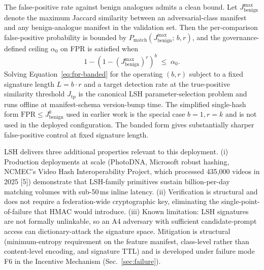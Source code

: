 \documentclass[11pt]{article}
\begin{document}
The false-positive rate against benign analogues admits a clean bound. Let $J_{\text{benign}}^{\max}$ denote the maximum Jaccard similarity between an adversarial-class manifest and any benign-analogue manifest in the validation set. Then the per-comparison false-positive probability is bounded by $P_{\text{match}}(J_{\text{benign}}^{\max};\, b, r)$, and the governance-defined ceiling $\alpha_0$ on FPR is satisfied when
\begin{equation}
1 - \left(1 - (J_{\text{benign}}^{\max})^{r}\right)^{b} \;\leq\; \alpha_0.
\label{eq:fpr-banded}
\end{equation}
Solving Equation~\eqref{eq:fpr-banded} for the operating $(b, r)$ subject to a fixed signature length $L = b \cdot r$ and a target detection rate at the true-positive similarity threshold $J_{\text{tp}}$ is the canonical LSH parameter-selection problem and runs offline at manifest-schema version-bump time. The simplified single-hash form $\text{FPR} \leq J_{\text{benign}}^{k}$ used in earlier work is the special case $b=1, r=k$ and is not used in the deployed configuration. The banded form gives substantially sharper false-positive control at fixed signature length.

LSH delivers three additional properties relevant to this deployment. (i) Production deployments at scale (PhotoDNA, Microsoft robust hashing, NCMEC's Video Hash Interoperability Project, which processed 435{,}000 videos in 2025 [5]) demonstrate that LSH-family primitives sustain billion-per-day matching volumes with sub-50\,ms inline latency. (ii) Verification is structural and does not require a federation-wide cryptographic key, eliminating the single-point-of-failure that HMAC would introduce. (iii) Known limitation: LSH signatures are not formally unlinkable, so an A4 adversary with sufficient candidate-prompt access can dictionary-attack the signature space. Mitigation is structural (minimum-entropy requirement on the feature manifest, class-level rather than content-level encoding, and signature TTL) and is developed under failure mode F6 in the Incentive Mechanism (Sec.~\ref{sec:failure}).
\end{document}
